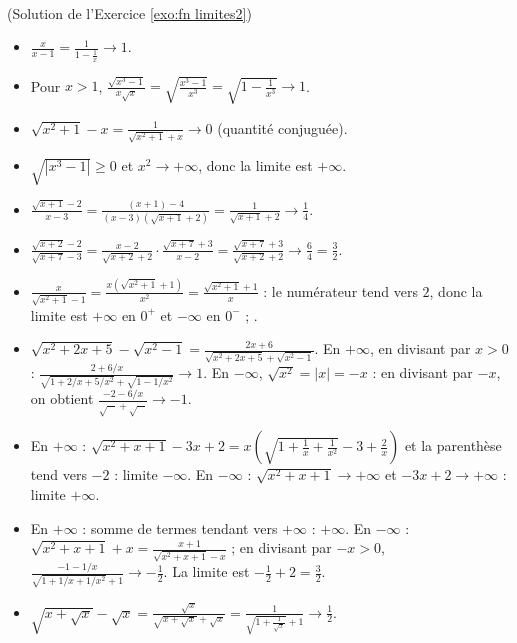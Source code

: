 \begin{corrige}
\begin{sol} ~ \\
(Solution de l'Exercice \ref{exo:fn limites2})
\begin{itemize}
\item $\frac{x}{x-1} = \frac{1}{1 - \frac{1}{x}} \to \boxed{1}$.
\item Pour $x > 1$, $\frac{\sqrt{x^3-1}}{x\sqrt{x}} = \sqrt{\frac{x^3 - 1}{x^3}} = \sqrt{1 - \frac{1}{x^3}} \to \boxed{1}$.
\item $\sqrt{x^2+1} - x = \frac{1}{\sqrt{x^2+1} + x} \to \boxed{0}$ (quantit\'e conjugu\'ee).
\item $\sqrt{|x^3 - 1|} \geq 0$ et $x^2 \to +\infty$, donc la limite est $\boxed{+\infty}$.
\item $\frac{\sqrt{x+1} - 2}{x - 3} = \frac{(x + 1) - 4}{(x-3)(\sqrt{x+1} + 2)} = \frac{1}{\sqrt{x+1} + 2} \to \boxed{\frac{1}{4}}$.
\item $\frac{\sqrt{x+2}-2}{\sqrt{x+7}-3} = \frac{x - 2}{\sqrt{x+2} + 2} \cdot \frac{\sqrt{x+7} + 3}{x - 2} = \frac{\sqrt{x+7}+3}{\sqrt{x+2}+2} \to \frac{6}{4} = \boxed{\frac{3}{2}}$.
\item $\frac{x}{\sqrt{x^2+1} - 1} = \frac{x\left(\sqrt{x^2+1}+1\right)}{x^2} = \frac{\sqrt{x^2+1}+1}{x}$ : le num\'erateur tend vers $2$,
      donc la limite est $+\infty$ en $0^+$ et $-\infty$ en $0^-$ ; .
\item $\sqrt{x^2+2x+5} - \sqrt{x^2-1} = \frac{2x + 6}{\sqrt{x^2+2x+5} + \sqrt{x^2-1}}$.
      En $+\infty$, en divisant par $x > 0$ : $\frac{2 + 6/x}{\sqrt{1 + 2/x + 5/x^2} + \sqrt{1 - 1/x^2}} \to \boxed{1}$.
      En $-\infty$, $\sqrt{x^2} = |x| = -x$ : en divisant par $-x$, on obtient $\frac{-2 - 6/x}{\sqrt{\cdots} + \sqrt{\cdots}} \to \boxed{-1}$.
\item En $+\infty$ : $\sqrt{x^2+x+1} - 3x + 2 = x\left(\sqrt{1 + \frac{1}{x} + \frac{1}{x^2}} - 3 + \frac{2}{x}\right)$ et la parenth\`ese tend vers $-2$ :
      limite $\boxed{-\infty}$. En $-\infty$ : $\sqrt{x^2+x+1} \to +\infty$ et $-3x + 2 \to +\infty$ : limite $\boxed{+\infty}$.
\item En $+\infty$ : somme de termes tendant vers $+\infty$ : $\boxed{+\infty}$.
      En $-\infty$ : $\sqrt{x^2+x+1} + x = \frac{x + 1}{\sqrt{x^2+x+1} - x}$ ; en divisant par $-x > 0$,
      $\frac{-1 - 1/x}{\sqrt{1 + 1/x + 1/x^2} + 1} \to -\frac{1}{2}$. La limite est $-\frac{1}{2} + 2 = \boxed{\frac{3}{2}}$.
\item $\sqrt{x + \sqrt{x}} - \sqrt{x} = \frac{\sqrt{x}}{\sqrt{x + \sqrt{x}} + \sqrt{x}} = \frac{1}{\sqrt{1 + \frac{1}{\sqrt{x}}} + 1} \to \boxed{\frac{1}{2}}$.
\end{itemize}
\end{sol}


\end{corrige}
